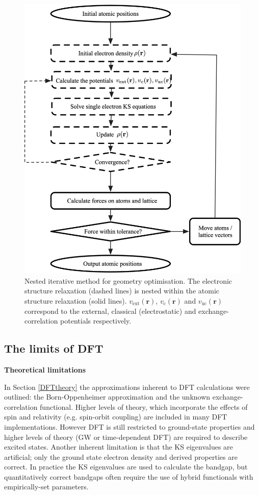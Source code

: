 \begin{figure}[h]
\centering
  \includegraphics[width=0.7\columnwidth]{figures/ch3/scf.png}
  \caption[Nested iterative method for geometry optimisation]{Nested iterative method for geometry optimisation. The electronic structure relaxation (dashed lines) is nested within the atomic structure relaxation (solid lines). $v_\textrm{ext}(\textbf{r})$, $v_\textrm{c}(\textbf{r})$ and $v_\textrm{xc}(\textbf{r})$ correspond to the external, classical (electrostatic) and exchange-correlation potentials respectively.} 
  \label{SCF}
\end{figure}

\subsection{The limits of DFT} \label{numericalsubsection}


\textbf{Theoretical limitations} 

In Section \ref{DFTtheory} the approximations inherent to DFT calculations were outlined: the Born-Oppenheimer approximation and the unknown exchange-correlation functional. Higher levels of theory, which incorporate the effects of spin and relativity (e.g. spin-orbit coupling) are included in many DFT implementations. However DFT is still restricted to ground-state properties and higher levels of theory (GW or time-dependent DFT) are required to describe excited states. Another inherent limitation is that the KS eigenvalues are artificial; only the ground state electron density and derived properties are correct. In practice the KS eigenvalues are used to calculate the bandgap, but quantitatively correct bandgaps often require the use of hybrid functionals with empirically-set parameters.


